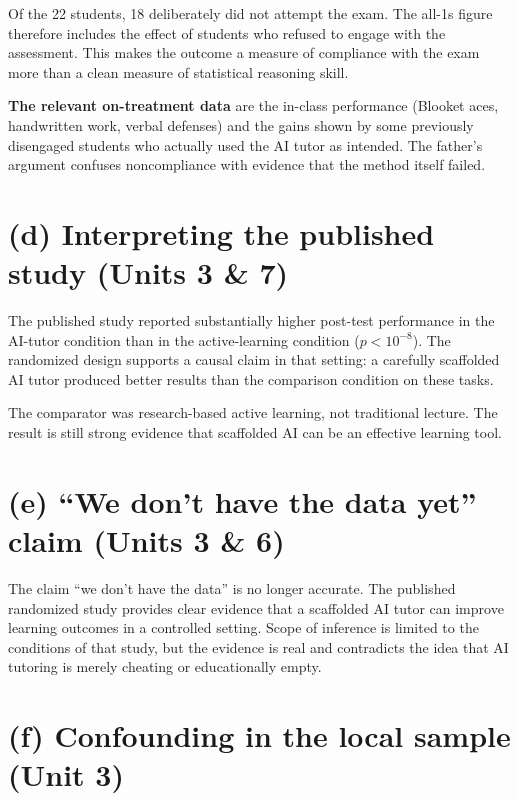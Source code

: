 \documentclass[11pt]{article}
\begin{document}
Of the 22 students, 18 deliberately did not attempt the exam. The
all-1s figure therefore includes the effect of students who refused to
engage with the assessment. This makes the outcome a measure of
compliance with the exam more than a clean measure of statistical
reasoning skill.

\textbf{The relevant on-treatment data} are the in-class performance
(Blooket aces, handwritten work, verbal defenses) and the gains shown
by some previously disengaged students who actually used the AI tutor
as intended. The father's argument confuses noncompliance with
evidence that the method itself failed.

\section{(d) Interpreting the published study \textnormal{\small(Units 3 \& 7)}}

The published study reported substantially higher post-test performance
in the AI-tutor condition than in the active-learning condition
($p < 10^{-8}$). The randomized design supports a causal claim in that
setting: a carefully scaffolded AI tutor produced better results than
the comparison condition on these tasks.

\begin{notebox}
The comparator was research-based active learning, not traditional
lecture. The result is still strong evidence that scaffolded AI can
be an effective learning tool.
\end{notebox}

\section{(e) ``We don't have the data yet'' claim \textnormal{\small(Units 3 \& 6)}}

The claim ``we don't have the data'' is no longer accurate. The
published randomized study provides clear evidence that a scaffolded
AI tutor can improve learning outcomes in a controlled setting. Scope
of inference is limited to the conditions of that study, but the
evidence is real and contradicts the idea that AI tutoring is merely
cheating or educationally empty.

\section{(f) Confounding in the local sample \textnormal{\small(Unit 3)}}
\end{document}
